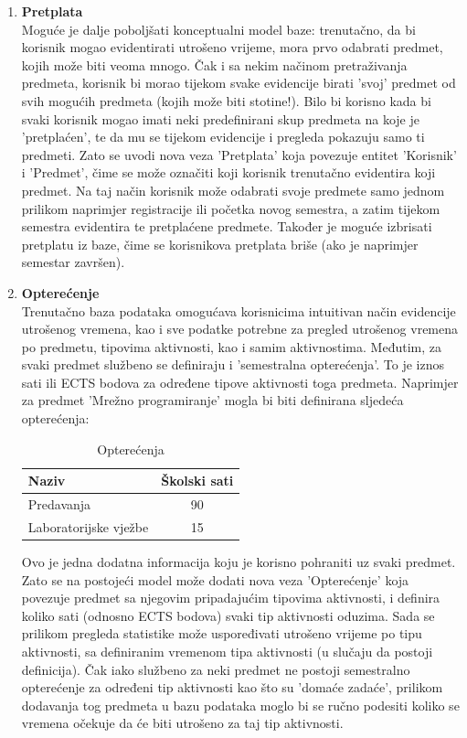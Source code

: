 \documentclass[times, utf8, zavrsni, numeric]{fer}
\begin{document}
\begin{enumerate}[leftmargin=*]
\item \textbf{Pretplata}\\
Moguće je dalje poboljšati konceptualni model baze: trenutačno, da bi korisnik mogao evidentirati utrošeno vrijeme, mora prvo odabrati predmet, kojih može biti veoma mnogo. Čak i sa nekim načinom pretraživanja predmeta, korisnik bi morao tijekom svake evidencije birati 'svoj' predmet od svih mogućih predmeta (kojih može biti stotine!). Bilo bi korisno kada bi svaki korisnik mogao imati neki predefinirani skup predmeta na koje je 'pretplaćen', te da mu se tijekom evidencije i pregleda pokazuju samo ti predmeti. Zato se uvodi nova veza 'Pretplata' koja povezuje entitet 'Korisnik' i 'Predmet', čime se može označiti koji korisnik trenutačno evidentira koji predmet. Na taj način korisnik može odabrati svoje predmete samo jednom prilikom naprimjer registracije ili početka novog semestra, a zatim tijekom semestra evidentira te pretplaćene predmete. Također je moguće izbrisati pretplatu iz baze, čime se korisnikova pretplata briše (ako je naprimjer semestar završen).

\item \textbf{Opterećenje}\\
Trenutačno baza podataka omogućava korisnicima intuitivan način evidencije utrošenog vremena, kao i sve podatke potrebne za pregled utrošenog vremena po predmetu, tipovima aktivnosti, kao i samim aktivnostima. Međutim, za svaki predmet službeno se definiraju  i 'semestralna opterećenja'. To je iznos sati ili ECTS bodova za određene tipove aktivnosti toga predmeta. Naprimjer za predmet 'Mrežno programiranje' mogla bi biti definirana sljedeća opterećenja:

\begin{table}[H]
\caption{Opterećenja}
\label{tbl:opterecenja}
\centering
\begin{tabular}{lc} \hline
Naziv & Školski sati\\ \hline
Predavanja & 90 \\
Laboratorijske vježbe & 15 \\ \hline
\end{tabular}
\end{table}

Ovo je jedna dodatna informacija koju je korisno pohraniti uz svaki predmet. Zato se na postojeći model može dodati nova veza 'Opterećenje' koja povezuje predmet sa njegovim pripadajućim tipovima aktivnosti, i definira koliko sati (odnosno ECTS bodova) svaki tip aktivnosti oduzima. Sada se prilikom pregleda statistike može uspoređivati utrošeno vrijeme po tipu aktivnosti, sa definiranim vremenom tipa aktivnosti (u slučaju da postoji definicija). Čak iako službeno za neki predmet ne postoji semestralno opterećenje za određeni tip aktivnosti kao što su 'domaće zadaće', prilikom dodavanja tog predmeta u bazu podataka moglo bi se ručno podesiti koliko se vremena očekuje da će biti utrošeno za taj tip aktivnosti.
\end{enumerate}
\end{document}
